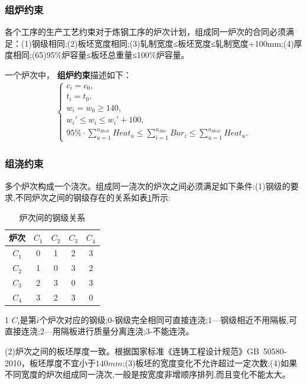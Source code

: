 \documentclass{whutmod}
\begin{document}
		
		\subsubsection{组炉约束}
		各个工序的生产工艺约束对于炼钢工序的炉次计划，组成同一炉次的合同必须满足：(1)钢级相同;(2)板坯宽度相同;(3)轧制宽度≤板坯宽度≤轧制宽度+100mm;(4)厚度相同;(65)95\%炉容量≤板坯总重量≤100\%炉容量。
		
		一个炉次中，
		\textbf{组炉约束}描述如下：
		\begin{gather}
		\left\{\begin{matrix}
		c_i=c_0,
		\\ t_i=t_0,
		\\ w_i=w_0\geq 140,
		\\ w_i'\leq w_i\leq w_i'+100,
		\\ 95\% \cdot \sum_{u=1}^{n_{Heat}}Heat_u\leq\sum_{i=1}^{n_{Bar}}Bar_i\leq\sum_{u=1}^{n_{Heat}}Heat_u.
		\end{matrix}\right.
		\end{gather}
		
		\subsubsection{组浇约束}
		多个炉次构成一个浇次。组成同一浇次的炉次之间必须满足如下条件:(1)钢级的要求,不同炉次之间的钢级存在的关系如表\ref{biao1}所示:
		\begin{table}[H]
			\centering		
			\caption{炉次间的钢级关系}\label{biao1}
			\begin{threeparttable}
			\begin{tabular}{ccccc}
				\toprule[2pt]
				\multicolumn{1}{m{2cm}}{\centering 炉次\tnote{1}}
				& \multicolumn{1}{m{2cm}}{\centering $C_1$}
				& \multicolumn{1}{m{2cm}}{\centering $C_2$}
				& \multicolumn{1}{m{2cm}}{\centering $C_3$}
				& \multicolumn{1}{m{2cm}}{\centering $C_4$}
				\\
				\midrule[1pt]
				$C_1$ &0&1&2&3\\ 
				$C_2$ &1&0&3&2\\ 
				$C_3$ &2&3&0&3\\ 
				$C_4$ &3&2&3&0\\ 
				\bottomrule[2pt]	
			\end{tabular}
		\begin{tablenotes}
			\footnotesize
			\item[1]$C_i$是第$i$个炉次对应的钢级;0-钢级完全相同可直接连浇;1—钢级相近不用隔板,可直接连浇;2—用隔板进行质量分离连浇;3-不能连浇。
		\end{tablenotes}
		\end{threeparttable}
		\end{table}
		(2)炉次之间的板坯厚度一致。根据国家标准《连铸工程设计规范》GB\ 50580-2010，板坯厚度不宜小于$140mm$;(3)板坯的宽度变化不允许超过一定次数;(4)如果不同宽度的炉次组成同一浇次,一般是按宽度非增顺序排列,而且变化不能太大。
		
\end{document}
